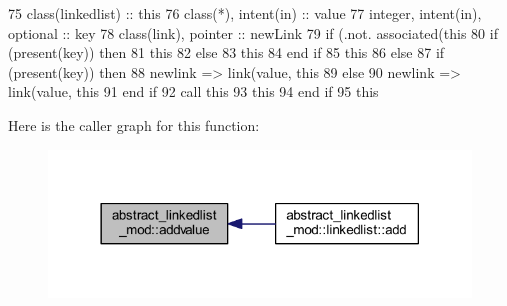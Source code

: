 \begin{DoxyCode}
75     \textcolor{keywordtype}{class}(linkedlist) :: this
76     \textcolor{keywordtype}{class}(*), \textcolor{keywordtype}{intent(in)} :: value
77     \textcolor{keywordtype}{integer}, \textcolor{keywordtype}{intent(in)}, \textcolor{keywordtype}{optional} :: key
78     \textcolor{keywordtype}{class}(link), \textcolor{keywordtype}{pointer} :: newLink
79     \textcolor{keywordflow}{if} (.not. \textcolor{keyword}{associated}(this%
80         \textcolor{keywordflow}{if} (\textcolor{keyword}{present}(key)) \textcolor{keywordflow}{then}
81             this%
82         \textcolor{keywordflow}{else}
83             this%
84 \textcolor{keywordflow}{        end if}
85         this%
86     \textcolor{keywordflow}{else}
87         \textcolor{keywordflow}{if} (\textcolor{keyword}{present}(key)) \textcolor{keywordflow}{then}
88             newlink => link(\textcolor{keywordtype}{value}, this%
89         \textcolor{keywordflow}{else}
90             newlink => link(\textcolor{keywordtype}{value}, this%
91 \textcolor{keywordflow}{        end if}
92         \textcolor{keyword}{call }this%
93         this%
94 \textcolor{keywordflow}{    end if}
95     this%
\end{DoxyCode}
Here is the caller graph for this function\+:\nopagebreak
\begin{figure}[H]
\begin{center}
\leavevmode
\includegraphics[width=318pt]{namespaceabstract__linkedlist__mod_a1075e2f234dacc9daf8407e14fac0929_icgraph}
\end{center}
\end{figure}
\mbox{\label{namespaceabstract__linkedlist__mod_a87a81a4be29c8d4e8d2fb0d02247033b}} 
